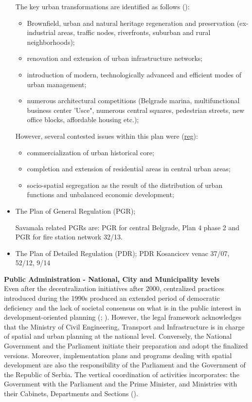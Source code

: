 \documentclass[11pt]{report}
\begin{document}
\begin{itemize}
The key urban transformations are identified as follows (\href{Stupar}{\citealt{stupar_aleksandra_recreating_2004}}):
\begin{itemize}
\item Brownfield, urban and natural heritage regeneration and preservation (ex-industrial  areas,  traffic  nodes, riverfronts,  suburban  and  rural neighborhoods);
\item renovation and extension of urban infrastructure networks;
\item introduction  of  modern, technologically  advanced  and  efficient  modes  of  urban management;
\item numerous  architectural  competitions (Belgrade marina, multifunctional business center 'Usce", numerous central squares, pedestrian streets, new office blocks, affordable housing etc.);
\end{itemize}

However, several contested issues within this plan were (\href{ref}{reg}):
\begin{itemize}
\item commercialization  of  urban  historical core;
\item completion and extension of residential  areas in central urban areas;
\item socio-spatial segregation as the result of the distribution of urban functions and unbalanced economic development;
\end{itemize}

\item The Plan of General Regulation (PGR);

Savamala related PGRs are: PGR for central Belgrade, Plan 4 phase 2 and PGR for fire station network 32/13.
\item The Plan of Detailed Regulation (PDR);
PDR Kosancicev venac 37/07, 52/12, 9/14
\end{itemize}

\textbf{Public Administration - National, City and Municipality levels}
\\
Even after the decentralization initiatives after 2000, centralized practices introduced during the 1990s produced an extended period of democratic deficiency and the lack of societal consensus on what is in the public interest in development-oriented planning (\href{Vujosevic}{\citealt{vujosevic_racionalnost_2004}}; \href{Vujosevic}{\citealt{vujosevic_collapse_2010}}).
However, the legal framework acknowledges that the Ministry of Civil Engineering, Transport and Infrastructure is in charge of spatial and urban planning at the national level.
Conversely, the National Government and the Parliament initiate their preparation and adopt the finalized versions.
Moreover, implementation plans and programs dealing with spatial development are also the responsibility of the Parliament and the Government of the Republic of Serbia.
The vertical coordination of activities incorporates: the Government with the Parliament and the Prime Minister, and Ministries with their Cabinets, Departments and Sections (\href{Stojkov}{\citealt{stojkov_prostorno_2012}}).
\\
\end{document}
